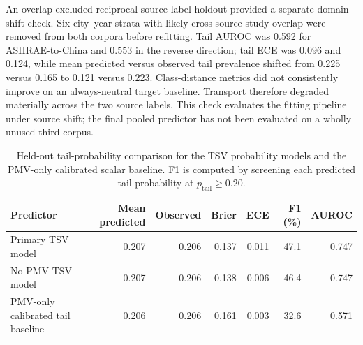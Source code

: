 An overlap-excluded reciprocal source-label holdout provided a separate domain-shift check. Six city--year strata with likely cross-source study overlap were removed from both corpora before refitting. Tail AUROC was 0.592 for ASHRAE-to-China and 0.553 in the reverse direction; tail ECE was 0.096 and 0.124, while mean predicted versus observed tail prevalence shifted from 0.225 versus 0.165 to 0.121 versus 0.223. Class-distance metrics did not consistently improve on an always-neutral target baseline. Transport therefore degraded materially across the two source labels. This check evaluates the fitting pipeline under source shift; the final pooled predictor has not been evaluated on a wholly unused third corpus.

\begin{table}[htbp]
\centering
\caption{Held-out tail-probability comparison for the TSV probability models and the PMV-only calibrated scalar baseline. F1 is computed by screening each predicted tail probability at $p_{\mathrm{tail}}\ge0.20$.}
\label{tab:tail_probability_comparison}
\scriptsize
\setlength{\tabcolsep}{4.2pt}
\begin{tabular}{lrrrrrr}
\toprule
\textbf{Predictor} & \textbf{Mean predicted} & \textbf{Observed} & \textbf{Brier} & \textbf{ECE} & \textbf{F1 (\%)} & \textbf{AUROC} \\
\midrule
Primary TSV model & 0.207 & 0.206 & 0.137 & 0.011 & 47.1 & 0.747 \\
No-PMV TSV model & 0.207 & 0.206 & 0.138 & 0.006 & 46.4 & 0.747 \\
PMV-only calibrated tail baseline & 0.206 & 0.206 & 0.161 & 0.003 & 32.6 & 0.571 \\
\bottomrule
\end{tabular}
\end{table}

